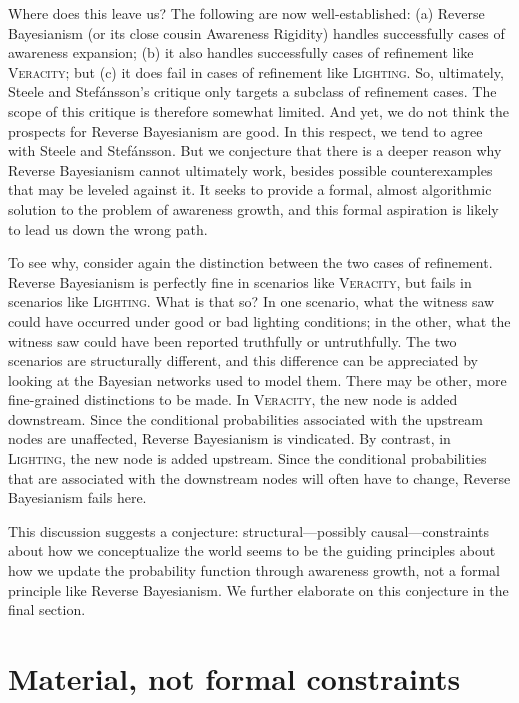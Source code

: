 \documentclass[
  11pt,
  dvipsnames,enabledeprecatedfontcommands]{scrartcl}
\begin{document}
Where does this leave us? The following are now well-established: (a)
Reverse Bayesianism (or its close cousin Awareness Rigidity) handles
successfully cases of awareness expansion; (b) it also handles
successfully cases of refinement like \textsc{Veracity}; but (c) it does
fail in cases of refinement like \textsc{Lighting}. So, ultimately,
Steele and Stefánsson's critique only targets a subclass of refinement
cases. The scope of this critique is therefore somewhat limited. And
yet, we do not think the prospects for Reverse Bayesianism are good. In
this respect, we tend to agree with Steele and Stefánsson. But we
conjecture that there is a deeper reason why Reverse Bayesianism cannot
ultimately work, besides possible counterexamples that may be leveled
against it. It seeks to provide a formal, almost algorithmic solution to
the problem of awareness growth, and this formal aspiration is likely to
lead us down the wrong path.

To see why, consider again the distinction between the two cases of
refinement. Reverse Bayesianism is perfectly fine in scenarios like
\textsc{Veracity}, but fails in scenarios like \textsc{Lighting}. What
is that so? In one scenario, what the witness saw could have occurred
under good or bad lighting conditions; in the other, what the witness
saw could have been reported truthfully or untruthfully. The two
scenarios are structurally different, and this difference can be
appreciated by looking at the Bayesian networks used to model them.
There may be other, more fine-grained distinctions to be made. In
\textsc{Veracity}, the new node is added downstream. Since the
conditional probabilities associated with the upstream nodes are
unaffected, Reverse Bayesianism is vindicated. By contrast, in
\textsc{Lighting}, the new node is added upstream. Since the conditional
probabilities that are associated with the downstream nodes will often
have to change, Reverse Bayesianism fails here.

This discussion suggests a conjecture: structural---possibly
causal---constraints about how we conceptualize the world seems to be
the guiding principles about how we update the probability function
through awareness growth, not a formal principle like Reverse
Bayesianism. We further elaborate on this conjecture in the final
section.

\hypertarget{material-not-formal-constraints}{%
\section{Material, not formal
constraints}\label{material-not-formal-constraints}}
\end{document}

